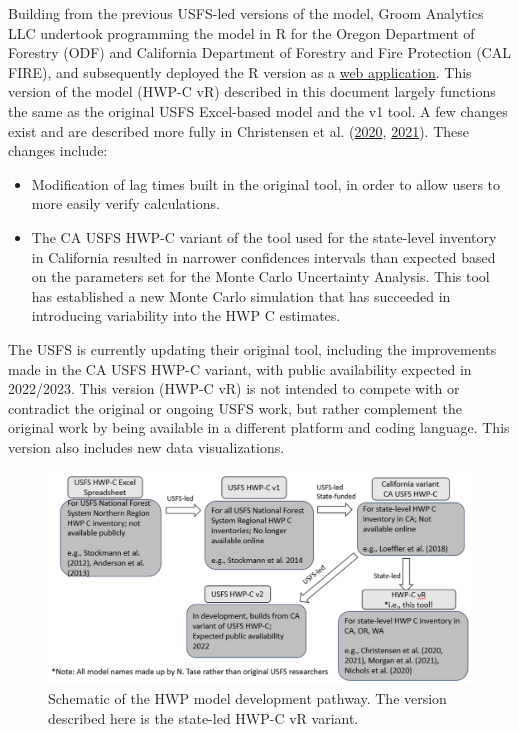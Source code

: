 \documentclass[
  openany]{book}
\providecommand{\tightlist}{%
  \setlength{\itemsep}{0pt}\setlength{\parskip}{0pt}}
\begin{document}
Building from the previous USFS-led versions of the model, Groom
Analytics LLC undertook programming the model in R for the Oregon
Department of Forestry (ODF) and California Department of Forestry and
Fire Protection (CAL FIRE), and subsequently deployed the R version as a
\href{https://groomanalyticsllc.shinyapps.io/HWP-C-vR/}{web
application}. This version of the model (HWP-C vR) described in this
document largely functions the same as the original USFS Excel-based
model and the v1 tool. A few changes exist and are described more fully
in Christensen et al. (\protect\hyperlink{ref-christensen2020}{2020},
\protect\hyperlink{ref-christensen2021}{2021}). These changes include:

\begin{itemize}
\tightlist
\item
  Modification of lag times built in the original tool, in order to
  allow users to more easily verify calculations.\\
\item
  The CA USFS HWP-C variant of the tool used for the state-level
  inventory in California resulted in narrower confidences intervals
  than expected based on the parameters set for the Monte Carlo
  Uncertainty Analysis. This tool has established a new Monte Carlo
  simulation that has succeeded in introducing variability into the HWP
  C estimates.
\end{itemize}

The USFS is currently updating their original tool, including the
improvements made in the CA USFS HWP-C variant, with public availability
expected in 2022/2023. This version (HWP-C vR) is not intended to
compete with or contradict the original or ongoing USFS work, but rather
complement the original work by being available in a different platform
and coding language. This version also includes new data visualizations.

\begin{figure}
\includegraphics[width=1\linewidth]{images/ModelHistory} \caption{Schematic of the HWP model development pathway.  The version described here is the state-led HWP-C vR variant.}\label{fig:hist-fig}
\end{figure}
\end{document}
